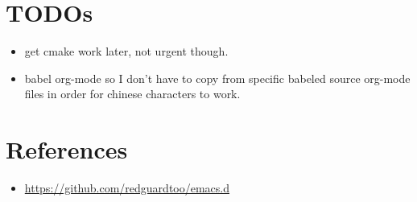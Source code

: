 \documentclass[9pt, b5paper]{article}
\begin{document}
\section{TODOs}
\label{sec-3}
\begin{itemize}
\item get cmake work later, not urgent though.
\item babel org-mode so I don't have to copy from specific babeled source org-mode files in order for chinese characters to work.
\end{itemize}

\section{References}
\label{sec-4}
\begin{itemize}
\item \url{https://github.com/redguardtoo/emacs.d}
\end{itemize}
\end{document}
